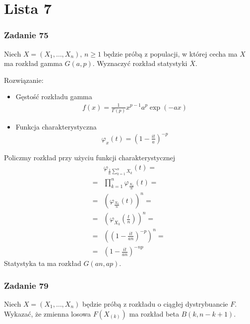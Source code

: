 \chapter*{Lista 7}


\subsection*{Zadanie 75}
Niech $ X=(X_1,\dots,X_n),\,n\ge 1 $ będzie próbą z populacji, w której cecha ma $ X $ ma rozkład gamma $ G(a,p) $. Wyznaczyć rozkład statystyki $ \overline X $.

Rozwiązanie:
\begin{itemize}
\item Gęstość rozkładu gamma
\begin{gather*}
f(x)=\frac{1}{\Gamma(p)}x^{p-1}a^p\exp\left(-ax\right)
\end{gather*}
\item Funkcja charakterystyczna
\begin{gather*}
\varphi_x(t)=\left(1 - \frac{it}{a}\right)^{-p}
\end{gather*}
\end{itemize}
Policzmy rozkład przy użyciu funkcji charakterystycznej
\begin{align*}
&\varphi_{\frac{1}{n}\sum_{k=1}^{n}X_k}(t)
=\\=&
\prod_{k=1}^{n}\varphi_{\frac{X_k}{n}}(t)
=\\=&
\left(\varphi_{\frac{X_k}{n}}(t)\right)^n
=\\=&
\left(\varphi_{{X_k}}\left(\frac{t}{n}\right)\right)^n
=\\=&
\left(\left(1 - \frac{it}{an}\right)^{-p}\right)^n
=\\=&
\left(1 - \frac{it}{an}\right)^{-np}
\end{align*}
Statystyka ta ma rozkład $ G(an,ap) $.


\subsection*{Zadanie 79}
Niech $ X=(X_1,\dots,X_n) $ będzie próbą z rozkładu o ciągłej dystrybuancie $ F $. Wykazać, że zmienna losowa $ F(X_{(k)}) $ ma rozkład beta $ B(k,n-k+1) $.

